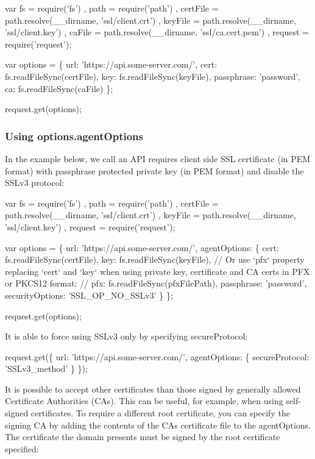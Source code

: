 \begin{DoxyCode}
var fs = require('fs')
    , path = require('path')
    , certFile = path.resolve(\_\_dirname, 'ssl/client.crt')
    , keyFile = path.resolve(\_\_dirname, 'ssl/client.key')
    , caFile = path.resolve(\_\_dirname, 'ssl/ca.cert.pem')
    , request = require('request');

var options = \{
    url: 'https://api.some-server.com/',
    cert: fs.readFileSync(certFile),
    key: fs.readFileSync(keyFile),
    passphrase: 'password',
    ca: fs.readFileSync(caFile)
\};

request.get(options);
\end{DoxyCode}


\subsubsection*{Using {\ttfamily options.\+agent\+Options}}

In the example below, we call an A\+PI requires client side S\+SL certificate (in P\+EM format) with passphrase protected private key (in P\+EM format) and disable the S\+S\+Lv3 protocol\+:


\begin{DoxyCode}
var fs = require('fs')
    , path = require('path')
    , certFile = path.resolve(\_\_dirname, 'ssl/client.crt')
    , keyFile = path.resolve(\_\_dirname, 'ssl/client.key')
    , request = require('request');

var options = \{
    url: 'https://api.some-server.com/',
    agentOptions: \{
        cert: fs.readFileSync(certFile),
        key: fs.readFileSync(keyFile),
        // Or use `pfx` property replacing `cert` and `key` when using private key, certificate and CA
       certs in PFX or PKCS12 format:
        // pfx: fs.readFileSync(pfxFilePath),
        passphrase: 'password',
        securityOptions: 'SSL\_OP\_NO\_SSLv3'
    \}
\};

request.get(options);
\end{DoxyCode}


It is able to force using S\+S\+Lv3 only by specifying {\ttfamily secure\+Protocol}\+:


\begin{DoxyCode}
request.get(\{
    url: 'https://api.some-server.com/',
    agentOptions: \{
        secureProtocol: 'SSLv3\_method'
    \}
\});
\end{DoxyCode}


It is possible to accept other certificates than those signed by generally allowed Certificate Authorities (C\+As). This can be useful, for example, when using self-\/signed certificates. To require a different root certificate, you can specify the signing CA by adding the contents of the CA\textquotesingle{}s certificate file to the {\ttfamily agent\+Options}. The certificate the domain presents must be signed by the root certificate specified\+:


